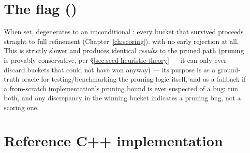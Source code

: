 \section{The  flag ()}

When set,  degenerates to an unconditional : every
bucket that survived  proceeds straight to full refinement
(Chapter~\ref{ch:scoring}), with no early rejection at all. This is strictly slower and produces
identical \emph{results} to the pruned path (pruning is provably conservative, per
\S\ref{sec:seed-heuristic-theory} --- it can only ever discard buckets that could not have won
anyway) — its purpose is as a ground-truth oracle for testing/benchmarking the pruning logic
itself, and as a fallback if a from-scratch implementation's pruning bound is ever suspected of a
bug: run both, and any discrepancy in the winning bucket indicates a pruning bug, not a scoring
one.

\section{Reference C++ implementation}

